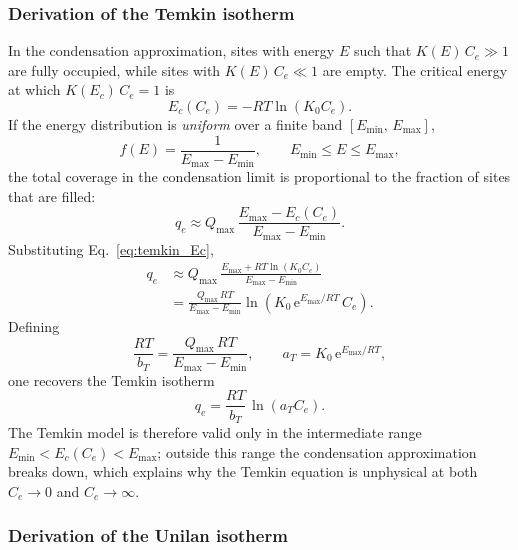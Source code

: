 	\subsubsection{Derivation of the Temkin isotherm}

	In the condensation approximation, sites with energy $E$ such that
	$K(E)\,C_e \gg 1$ are fully occupied, while sites with
	$K(E)\,C_e \ll 1$ are empty. The critical energy at which
	$K(E_c)\,C_e = 1$ is
	\begin{equation}
		E_c(C_e) = -RT\ln(K_0 C_e).
		\label{eq:temkin_Ec}
	\end{equation}
	If the energy distribution is \emph{uniform} over a finite band
	$[E_{\min},\, E_{\max}]$,
	\begin{equation}
		f(E) = \frac{1}{E_{\max} - E_{\min}},
		\qquad E_{\min} \leq E \leq E_{\max},
		\label{eq:temkin_fE}
	\end{equation}
	the total coverage in the condensation limit is proportional to the
	fraction of sites that are filled:
	\begin{equation}
		q_e \approx Q_{\max}\,
		\frac{E_{\max} - E_c(C_e)}{E_{\max} - E_{\min}}.
	\end{equation}
	Substituting Eq.~\eqref{eq:temkin_Ec},
	\begin{align}
		q_e
		&\approx Q_{\max}\,
		\frac{E_{\max} + RT\ln(K_0 C_e)}{E_{\max} - E_{\min}}
		\nonumber\\
		&= \frac{Q_{\max}\,RT}{E_{\max} - E_{\min}}
		\ln\!\left(K_0\, \mathrm{e}^{E_{\max}/RT}\, C_e\right).
	\end{align}
	Defining
	\begin{equation}
		\frac{RT}{b_T} = \frac{Q_{\max}\,RT}{E_{\max} - E_{\min}},
		\qquad
		a_T = K_0\, \mathrm{e}^{E_{\max}/RT},
	\end{equation}
	one recovers the Temkin isotherm
	\begin{equation}
		\boxed{q_e = \frac{RT}{b_T}\,\ln(a_T C_e).}
	\end{equation}
	The Temkin model is therefore valid only in the intermediate range
	$E_{\min} < E_c(C_e) < E_{\max}$; outside this range the
	condensation approximation breaks down, which explains why the
	Temkin equation is unphysical at both $C_e \to 0$ and
	$C_e \to \infty$.

	\subsubsection{Derivation of the Unilan isotherm}

